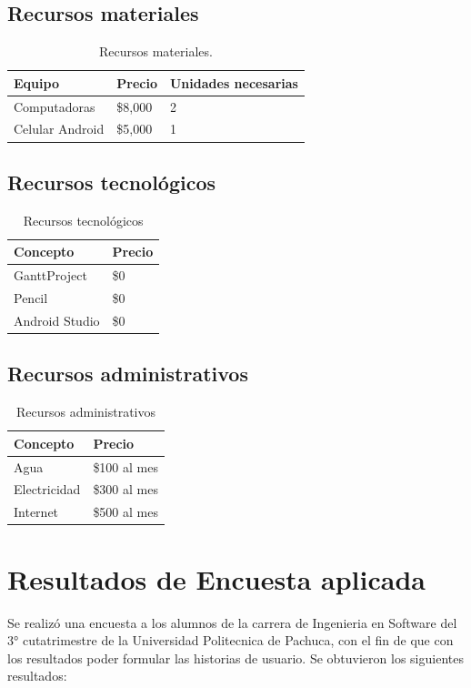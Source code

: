 \subsection{Recursos materiales}
\begin{table}[H]
\centering
\begin{tabular}{|l|l|l|}
\hline
Equipo          & Precio  & Unidades necesarias \\ \hline
Computadoras    & \$8,000 & 2                   \\ \hline
Celular Android & \$5,000 & 1                   \\ \hline
\end{tabular}
\caption{Recursos materiales.}
\label{materiales}
\end{table}

\subsection{Recursos tecnológicos}
\begin{table}[H]
\centering
\begin{tabular}{|l|l|}
\hline
Concepto       & Precio  \\ \hline
GanttProject   & \$0 \\ \hline
Pencil         & \$0 \\ \hline
Android Studio & \$0 \\ \hline
\end{tabular}
\caption{Recursos tecnológicos}
\label{tecnologicos}
\end{table}

\subsection{Recursos administrativos}
\begin{table}[H]
\centering
\begin{tabular}{|l|l|}
\hline
Concepto     & Precio       \\ \hline
Agua         & \$100 al mes \\ \hline
Electricidad & \$300 al mes \\ \hline
Internet     & \$500 al mes \\ \hline
\end{tabular}
\caption{Recursos administrativos}
\label{administrativos}
\end{table}



\section{Resultados de Encuesta aplicada}
Se realizó una encuesta a los alumnos de la carrera de Ingenieria en Software del 3° cutatrimestre de la Universidad Politecnica de Pachuca, con el fin de que con los resultados poder formular las historias de usuario. Se obtuvieron los siguientes resultados:

